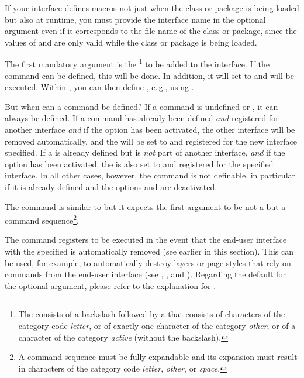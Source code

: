 If your interface defines macros not just when the class
or package is being loaded but also at runtime, you must provide the interface
name in the optional argument even if it corresponds to the file name of the
class or package, since the values of  and 
are only valid while the class or package is being loaded.

The first mandatory argument is the \footnote{The
   consists of a backslash followed by a  that consists of characters of the category code \emph{letter},
  or of exactly one character of the category \emph{other}, or of a character
  of the category \emph{active} (without the backslash).} to be added to the
interface. If the command can be defined, this will be done. In addition, it
will set to  and  will be executed. Within
, you can then define , e.\,g., using
.

But when can a command be defined? If a command is undefined or ,
it can always be defined. If a command has already been defined \emph{and}
registered for another interface \emph{and} if the \KOMAScript{} option
 has been activated, the other interface will be
removed automatically, and the  will be set to 
and registered for the new interface specified. If a  is
already defined but is \emph{not} part of another interface, \emph{and} if the
\KOMAScript{} option  has been activated, the
 is also set to  and registered for the specified
interface. In all other cases, however, the command is not definable, in
particular if it is already defined and the \KOMAScript{} options
 and  are deactivated.

The  command is similar to
 but it expects the first argument to be not a
 but a command sequence\footnote{A command sequence must be
  fully expandable and its expansion must result in characters of the category
  code \emph{letter}, \emph{other}, or \emph{space}.}.%
\EndIndexGroup


\begin{Declaration}
\end{Declaration}
The  command registers  to be
executed in the event that the end-user interface with the specified
 is automatically removed (see
 earlier in this section).
This can be used, for example, to automatically destroy layers or page styles
that rely on commands from the end-user interface (see
,
, and
). Regarding the default for
the optional argument, please refer to the explanation for
.%
\EndIndexGroup
%
\EndIndexGroup



